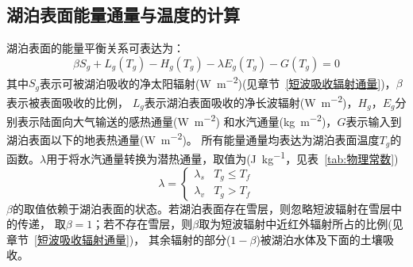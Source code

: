 \subsection{湖泊表面能量通量与温度的计算}
湖泊表面的能量平衡关系可表达为：
\begin{equation}
\beta S_{g}+L_{g}\left(T_{g}\right)-H_{g}\left(T_{g}\right)-\lambda E_{g}\left(T_{g}\right)-G\left(T_{g}\right)=0
\end{equation}
其中$S_g$表示可被湖泊吸收的净太阳辐射(\unit{W.m^{-2}})(见章节~\ref{短波吸收辐射通量})，$\beta$表示被表面吸收的比例，
$L_g$表示湖泊表面吸收的净长波辐射(\unit{W.m^{-2}})，$H_g$，$E_g$分别表示陆面向大气输送的感热通量(\unit{W.m^{-2}})
和水汽通量(\unit{kg.m^{-2}})，$G$表示输入到湖泊表面以下的地表热通量(\unit{W.m^{-2}})。
所有能量通量均表达为湖泊表面温度$T_g$的函数。$\lambda$用于将水汽通量转换为潜热通量，取值为(\unit{J.kg^{-1}}，见表~\ref{tab:物理常数})
\begin{equation}
\lambda=\left\{\begin{array}{ll}\lambda_{s} & T_{g} \leq T_{f} \\ \lambda_{v} & T_{g}>T_{f}\end{array}\right.
\end{equation}
$\beta$的取值依赖于湖泊表面的状态。若湖泊表面存在雪层，则忽略短波辐射在雪层中的传递，
取$\beta=1$；若不存在雪层，则$\beta$取为短波辐射中近红外辐射所占的比例(见章节~\ref{短波吸收辐射通量})，
其余辐射的部分($1-\beta$)被湖泊水体及下面的土壤吸收。


